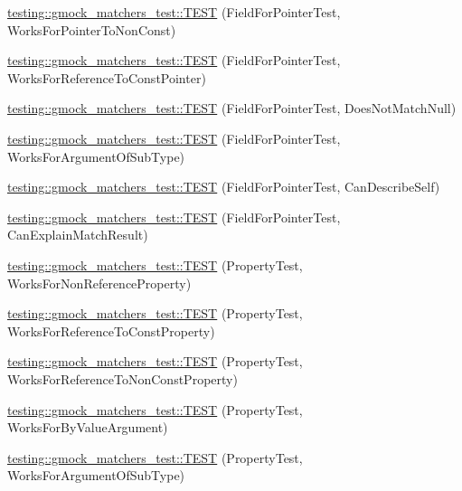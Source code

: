 \begin{DoxyCompactItemize}
\hyperlink{namespacetesting_1_1gmock__matchers__test_ac339a26bf6100a2eb2dd4bf908f8448c}{testing\+::gmock\+\_\+matchers\+\_\+test\+::\+T\+E\+ST} (Field\+For\+Pointer\+Test, Works\+For\+Pointer\+To\+Non\+Const)
\item 
\hyperlink{namespacetesting_1_1gmock__matchers__test_a603253edc7a2310c8a1db225cb589a99}{testing\+::gmock\+\_\+matchers\+\_\+test\+::\+T\+E\+ST} (Field\+For\+Pointer\+Test, Works\+For\+Reference\+To\+Const\+Pointer)
\item 
\hyperlink{namespacetesting_1_1gmock__matchers__test_a06a1c8d949707ab606627e9f6efe87b9}{testing\+::gmock\+\_\+matchers\+\_\+test\+::\+T\+E\+ST} (Field\+For\+Pointer\+Test, Does\+Not\+Match\+Null)
\item 
\hyperlink{namespacetesting_1_1gmock__matchers__test_a5447541a290e16a81aec6dd975983d57}{testing\+::gmock\+\_\+matchers\+\_\+test\+::\+T\+E\+ST} (Field\+For\+Pointer\+Test, Works\+For\+Argument\+Of\+Sub\+Type)
\item 
\hyperlink{namespacetesting_1_1gmock__matchers__test_a056670af8fc7bd3dfd170435dbf08c3c}{testing\+::gmock\+\_\+matchers\+\_\+test\+::\+T\+E\+ST} (Field\+For\+Pointer\+Test, Can\+Describe\+Self)
\item 
\hyperlink{namespacetesting_1_1gmock__matchers__test_a6a4ffd283f91f4e085aa582aedefe38e}{testing\+::gmock\+\_\+matchers\+\_\+test\+::\+T\+E\+ST} (Field\+For\+Pointer\+Test, Can\+Explain\+Match\+Result)
\item 
\hyperlink{namespacetesting_1_1gmock__matchers__test_a9c42c3b244c7b4d63040e469d5b31e1e}{testing\+::gmock\+\_\+matchers\+\_\+test\+::\+T\+E\+ST} (Property\+Test, Works\+For\+Non\+Reference\+Property)
\item 
\hyperlink{namespacetesting_1_1gmock__matchers__test_a7254899c6d45df648d5b4ef6eece3ae0}{testing\+::gmock\+\_\+matchers\+\_\+test\+::\+T\+E\+ST} (Property\+Test, Works\+For\+Reference\+To\+Const\+Property)
\item 
\hyperlink{namespacetesting_1_1gmock__matchers__test_a5b7b02e8fcef1aff9a4afc81d5fb5d5f}{testing\+::gmock\+\_\+matchers\+\_\+test\+::\+T\+E\+ST} (Property\+Test, Works\+For\+Reference\+To\+Non\+Const\+Property)
\item 
\hyperlink{namespacetesting_1_1gmock__matchers__test_af703b24e2bee13cf7a042f699809a5ab}{testing\+::gmock\+\_\+matchers\+\_\+test\+::\+T\+E\+ST} (Property\+Test, Works\+For\+By\+Value\+Argument)
\item 
\hyperlink{namespacetesting_1_1gmock__matchers__test_a38a5ad623dda9ef0f48ebaf65485d18e}{testing\+::gmock\+\_\+matchers\+\_\+test\+::\+T\+E\+ST} (Property\+Test, Works\+For\+Argument\+Of\+Sub\+Type)

\end{DoxyCompactItemize}
